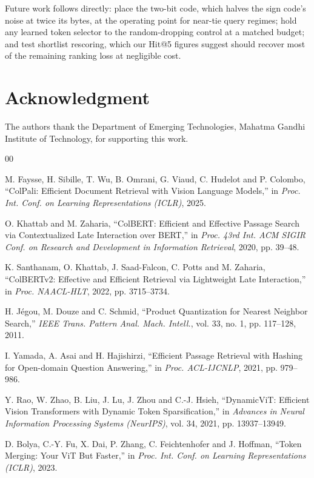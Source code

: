 \documentclass[conference]{IEEEtran}
\begin{document}
Future work follows directly: place the two-bit code, which halves
the sign code's noise at twice its bytes, at the operating point for near-tie
query regimes; hold any learned token selector to the random-dropping control
at a matched budget; and test shortlist rescoring, which our Hit@5 figures
suggest should recover most of the remaining ranking loss at negligible cost.

\section*{Acknowledgment}
The authors thank the Department of Emerging Technologies, Mahatma Gandhi
Institute of Technology, for supporting this work.

\begin{thebibliography}{00}

M. Faysse, H. Sibille, T. Wu, B. Omrani, G. Viaud, C. Hudelot and P. Colombo,
``ColPali: Efficient Document Retrieval with Vision Language Models,''
in \emph{Proc. Int. Conf. on Learning Representations (ICLR)}, 2025.

O. Khattab and M. Zaharia, ``ColBERT: Efficient and Effective Passage Search via
Contextualized Late Interaction over BERT,'' in \emph{Proc. 43rd Int. ACM SIGIR
Conf. on Research and Development in Information Retrieval}, 2020, pp. 39--48.

K. Santhanam, O. Khattab, J. Saad-Falcon, C. Potts and M. Zaharia, ``ColBERTv2:
Effective and Efficient Retrieval via Lightweight Late Interaction,'' in
\emph{Proc. NAACL-HLT}, 2022, pp. 3715--3734.

H. J\'egou, M. Douze and C. Schmid, ``Product Quantization for Nearest Neighbor
Search,'' \emph{IEEE Trans. Pattern Anal. Mach. Intell.}, vol. 33, no. 1,
pp. 117--128, 2011.

I. Yamada, A. Asai and H. Hajishirzi, ``Efficient Passage Retrieval with Hashing
for Open-domain Question Answering,'' in \emph{Proc. ACL-IJCNLP}, 2021,
pp. 979--986.

Y. Rao, W. Zhao, B. Liu, J. Lu, J. Zhou and C.-J. Hsieh, ``DynamicViT: Efficient
Vision Transformers with Dynamic Token Sparsification,'' in \emph{Advances in
Neural Information Processing Systems (NeurIPS)}, vol. 34, 2021,
pp. 13937--13949.

D. Bolya, C.-Y. Fu, X. Dai, P. Zhang, C. Feichtenhofer and J. Hoffman, ``Token
Merging: Your ViT But Faster,'' in \emph{Proc. Int. Conf. on Learning
Representations (ICLR)}, 2023.


\end{thebibliography}
\end{document}
